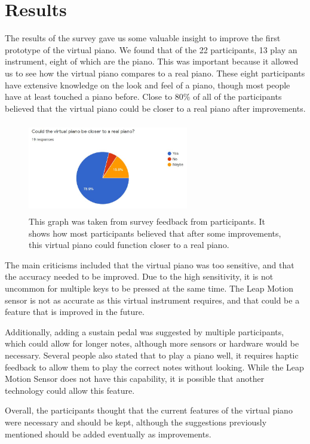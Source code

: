 \documentclass[conference,compsoc]{IEEEtran}
\begin{document}
\section{Results}
The results of the survey gave us some valuable insight to improve the first prototype of the virtual piano. We found that of the 22 participants, 13 play an instrument, eight of which are the piano. This was important because it allowed us to see how the virtual piano compares to a real piano. These eight participants have extensive knowledge on the look and feel of a piano, though most people have at least touched a piano before. Close to 80\% of all of the participants believed that the virtual piano could be closer to a real piano after improvements.

\begin{figure}[h]
\centering
\includegraphics[width=7cm, height=4cm]{IEEEtran/Graph2.JPG}
\centering
\caption{This graph was taken from survey feedback from participants. It shows how most participants believed that after some improvements, this virtual piano could function closer to a real piano.}
\end{figure}

The main criticisms included that the virtual piano was too sensitive, and that the accuracy needed to be improved. Due to the high sensitivity, it is not uncommon for multiple keys to be pressed at the same time. The Leap Motion sensor is not as accurate as this virtual instrument requires, and that could be a feature that is improved in the future. 

Additionally, adding a sustain pedal was suggested by multiple participants, which could allow for longer notes, although more sensors or hardware would be necessary. Several people also stated that to play a piano well, it requires haptic feedback to allow them to play the correct notes without looking. While the Leap Motion Sensor does not have this capability, it is possible that another technology could allow this feature.

Overall, the participants thought that the current features of the virtual piano were necessary and should be kept, although the suggestions previously mentioned should be added eventually as improvements.
\end{document}
